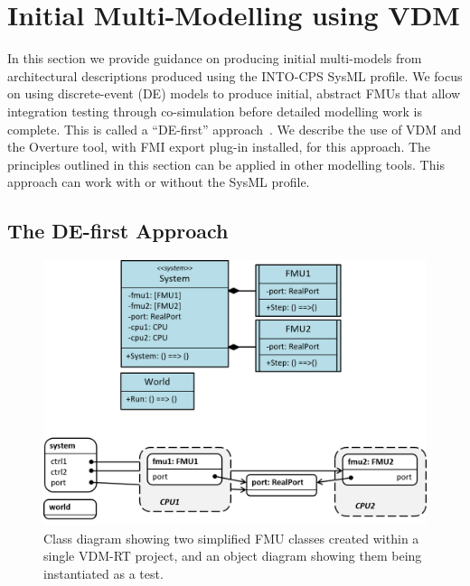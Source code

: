 \chapter{Initial Multi-Modelling using VDM}
\label{sec:initial}

In this section we provide guidance on producing initial multi-models from architectural descriptions produced using the INTO-CPS SysML profile. We focus on using discrete-event (DE) models to produce initial, abstract FMUs that allow integration testing through co-simulation before detailed modelling work is complete. This is called a ``DE-first'' approach~\cite{Fitzgerald&13b,Fitzgerald&13a}. We describe the use of VDM and the Overture tool, with FMI export plug-in installed, for this approach. The principles outlined in this section can be applied in other modelling tools. This approach can work with or without the SysML profile.


\section{The DE-first Approach}

\begin{figure}[p]
\centering
\includegraphics[scale=0.47]{figures/defirst_class}
\caption{Class diagram showing two simplified FMU classes created within a single VDM-RT project, and an object diagram showing them being instantiated as a test.}
\label{fig:defist_class}
\end{figure}

